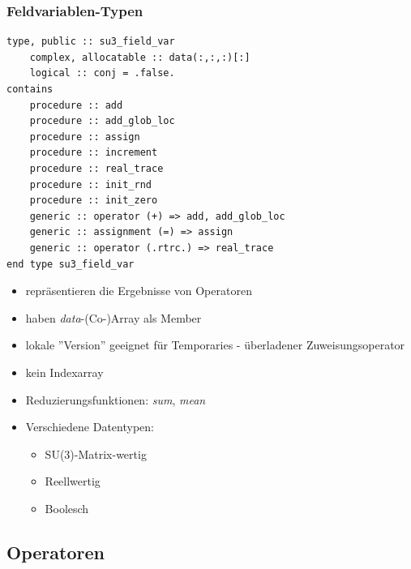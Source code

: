 \documentclass[10pt]{beamer}
\begin{document}
\begin{frame}[fragile]
    \frametitle{Feldvariablen-Typen}
    \begin{minipage}{0.48\linewidth}
    \begin{lstlisting}
type, public :: su3_field_var
    complex, allocatable :: data(:,:,:)[:]
    logical :: conj = .false.
contains
    procedure :: add
    procedure :: add_glob_loc
    procedure :: assign
    procedure :: increment
    procedure :: real_trace
    procedure :: init_rnd
    procedure :: init_zero
    generic :: operator (+) => add, add_glob_loc
    generic :: assignment (=) => assign
    generic :: operator (.rtrc.) => real_trace
end type su3_field_var
\end{lstlisting}
\end{minipage}
    \hfill
    \begin{minipage}{0.48\linewidth}
        \begin{itemize}
        	\item repräsentieren die Ergebnisse von Operatoren
        	\item haben \emph{data}-(Co-)Array als Member
        	\item lokale ''Version'' geeignet für Temporaries - überladener Zuweisungsoperator
        	\item kein Indexarray
        	\item Reduzierungsfunktionen: \emph{sum}, \emph{mean}
        	\item Verschiedene Datentypen:
        	\begin{itemize}
        		\item SU(3)-Matrix-wertig
        		\item Reellwertig
        		\item Boolesch
        	\end{itemize}
        \end{itemize}
    \end{minipage}
\end{frame}


\subsection*{Operatoren}

\end{document}
